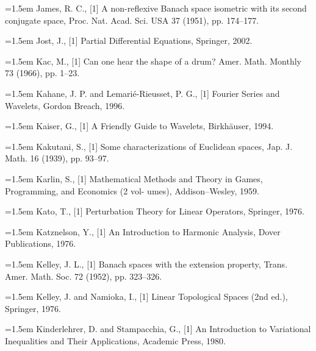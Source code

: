 \noindent\hangindent=1.5em James, R. C., \hypertarget{ref:James-1}{[1]} A non-reflexive Banach space isometric with its second conjugate space, Proc. Nat. Acad. Sci. USA 37 (1951), pp. 174--177.\par{}
\noindent\hangindent=1.5em Jost, J., \hypertarget{ref:Jost-1}{[1]} Partial Differential Equations, Springer, 2002.\par{}
\noindent\hangindent=1.5em Kac, M., \hypertarget{ref:Kac-1}{[1]} Can one hear the shape of a drum? Amer. Math. Monthly 73 (1966), pp. 1--23.\par{}
\noindent\hangindent=1.5em Kahane, J. P. and Lemarié-Rieusset, P. G., \hypertarget{ref:KahaneLemarie-1}{[1]} Fourier Series and Wavelets, Gordon Breach, 1996.\par{}
\noindent\hangindent=1.5em Kaiser, G., \hypertarget{ref:Kaiser-1}{[1]} A Friendly Guide to Wavelets, Birkhäuser, 1994.\par{}
\noindent\hangindent=1.5em Kakutani, S., \hypertarget{ref:Kakutani-1}{[1]} Some characterizations of Euclidean spaces, Jap. J. Math. 16 (1939), pp. 93--97.\par{}
\noindent\hangindent=1.5em Karlin, S., \hypertarget{ref:Karlin-1}{[1]} Mathematical Methods and Theory in Games, Programming, and Economics (2 vol- umes), Addison--Wesley, 1959.\par{}
\noindent\hangindent=1.5em Kato, T., \hypertarget{ref:Kato-1}{[1]} Perturbation Theory for Linear Operators, Springer, 1976.\par{}
\noindent\hangindent=1.5em Katznelson, Y., \hypertarget{ref:Katznelson-1}{[1]} An Introduction to Harmonic Analysis, Dover Publications, 1976.\par{}
\noindent\hangindent=1.5em Kelley, J. L., \hypertarget{ref:Kelley-1}{[1]} Banach spaces with the extension property, Trans. Amer. Math. Soc. 72 (1952), pp. 323--326.\par{}
\noindent\hangindent=1.5em Kelley, J. and Namioka, I., \hypertarget{ref:KelleyNamioka-1}{[1]} Linear Topological Spaces (2nd ed.), Springer, 1976.\par{}
\noindent\hangindent=1.5em Kinderlehrer, D. and Stampacchia, G., \hypertarget{ref:KinderlehrerStampacchia-1}{[1]} An Introduction to Variational Inequalities and Their Applications, Academic Press, 1980.\par{}

